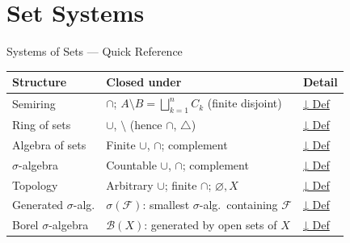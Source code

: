 \section{Set Systems}


\begin{toolkitbox}{Systems of Sets — Quick Reference}
\small
\begin{tabular}{l l l}
\toprule
\textbf{Structure} & \textbf{Closed under} & \textbf{Detail} \\
\midrule
Semiring         & $\cap$;\; $A \setminus B = \bigsqcup_{k=1}^n C_k$ (finite disjoint)  & \hyperref[def:semiring-of-sets]{↓ Def} \\
Ring of sets     & $\cup$,\; $\setminus$ (hence $\cap$, $\triangle$)                    & \hyperref[def:ring-of-sets]{↓ Def} \\
Algebra of sets  & Finite $\cup$, $\cap$; complement                                   & \hyperref[def:algebra-of-sets]{↓ Def} \\
$\sigma$-algebra & Countable $\cup$, $\cap$; complement                                & \hyperref[def:sigma-algebra]{↓ Def} \\
Topology         & Arbitrary $\cup$; finite $\cap$; $\varnothing, X$                   & \hyperref[def:topology-defn]{↓ Def} \\
\midrule
Generated $\sigma$-alg. & $\sigma(\mathcal{F})$: smallest $\sigma$-alg.\ containing $\mathcal{F}$ & \hyperref[def:generated-sigma]{↓ Def} \\
Borel $\sigma$-algebra  & $\mathcal{B}(X)$: generated by open sets of $X$                       & \hyperref[def:borel]{↓ Def} \\
\bottomrule
\end{tabular}
\end{toolkitbox}


